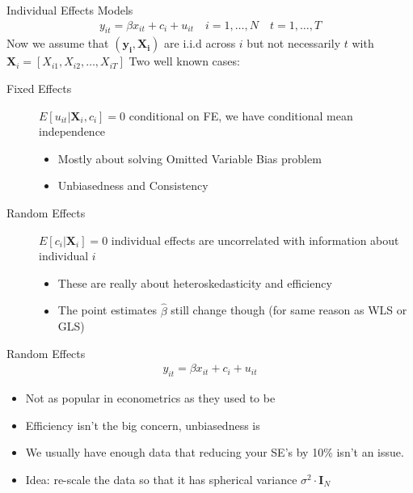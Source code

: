 \begin{frame}{Individual Effects Models}
\begin{align*}
y_{it} = \beta x_{it} + c_i + u_{it} \quad i=1,\ldots,N \quad t=1,\ldots,T
\end{align*}
Now we assume that $(\mathbf{y_i},\mathbf{X_i})$ are i.i.d across $i$ but not necessarily $t$ with $\mathbf{X}_i=[X_{i1},X_{i2},\ldots,X_{iT}]$
Two well known cases:
\begin{description}
    \item[Fixed Effects] $E[u_{it}| \mathbf{X}_i , c_i] = 0$ conditional on FE, we have \alert{conditional mean independence}
    \begin{itemize}
        \item Mostly about solving \alert{Omitted Variable Bias} problem
        \item \alert{Unbiasedness} and \alert{Consistency}
    \end{itemize}
    \item[Random Effects] $E[c_i | \mathbf{X}_i] = 0$ individual effects are uncorrelated with information about individual $i$
    \begin{itemize}
        \item These are really about \alert{heteroskedasticity} and \alert{efficiency}
        \item The point estimates $\widehat{\beta}$ still change though (for same reason as WLS or GLS)
    \end{itemize}
\end{description}
\end{frame}

\begin{frame}{Random Effects}
\begin{align*}
y_{it} = \beta x_{it} + c_i + u_{it}
\end{align*}
\begin{itemize}
    \item Not as popular in econometrics as they used to be
    \item \alert{Efficiency} isn't the big concern, \alert{unbiasedness} is
    \item We usually have enough data that reducing your SE's by 10\% isn't an issue. 
    \item Idea: re-scale the data so that it has \alert{spherical variance} $\sigma^2 \cdot \mathbf{I}_N$
\end{itemize}
\end{frame}


